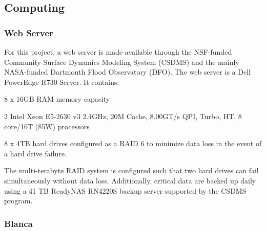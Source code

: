 

\subsection*{Computing}

\subsubsection*{Web Server}

For this project, a web server is made available through the NSF-funded Community Surface Dynamics Modeling System (CSDMS) and the mainly NASA-funded Dartmouth Flood Observatory (DFO).
The web server is a Dell PowerEdge R730 Server.
It contains:
\begin{compactitem}
\item 8 x 16GB RAM memory capacity
\item 2 Intel Xeon E5-2630 v3 2.4GHz, 20M Cache, 8.00GT/s QPI, Turbo, HT, 8 core/16T (85W) processors
\item 8 x 4TB hard drives configured as a RAID 6 to minimize data loss in the event of a hard drive failure.
\end{compactitem}
The multi-terabyte RAID system is configured such that two hard drives can fail simultaneously without data loss. Additionally, critical data are backed up daily using a 41 TB ReadyNAS RN4220S backup server supported by the CSDMS program.

\subsubsection*{Blanca}

